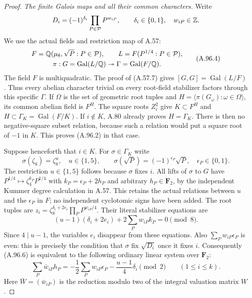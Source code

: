\begin{proof}
\emph{The finite Galois maps and all their common characters.}
Write
\[
 D_i=(-1)^{\delta_i}\prod_{P\in\mathcal P}P^{w_{iP}},
       \qquad \delta_i\in\{0,1\},\quad w_{iP}\in\mathbb Z.
\]
We use the
actual fields and restriction map of A.57:
\[
 \begin{gathered}
 F=\mathbb Q(\mu_8,\sqrt P:P\in\mathcal P),\qquad
 L=F(P^{1/4}:P\in\mathcal P),\\
 \pi:G=\operatorname{Gal}(L/\mathbb Q)\twoheadrightarrow
                     \Gamma=\operatorname{Gal}(F/\mathbb Q).
 \end{gathered}
 \tag{A.96.4}
\]
The field $F$ is multiquadratic.
The proof of (A.57.7) gives $[G,G]=\operatorname{Gal}(L/F)$.
Thus every abelian character trivial on every root-field
stabilizer factors through this specific $\Gamma$.
If $\Omega$ is the set of geometric root tuples and
$H=\langle\pi(G_\omega):\omega\in\Omega\rangle$, its common
abelian field is $F^H$.
The square roots $Z_i^2$ give $K\subset F^H$ and
$H\subset\Gamma_K=\operatorname{Gal}(F/K)$.
If $i\notin K$, A.80 already proves $H=\Gamma_K$.
There is then no negative-square subset relation, because
such a relation would put a square root of $-1$ in $K$.
This proves (A.96.2) in that case.

Suppose henceforth that $i\in K$.
For $\sigma\in\Gamma_K$ write
\[
 \sigma(\zeta_8)=\zeta_8^u,\quad u\in\{1,5\},\qquad
 \sigma(\sqrt P)=(-1)^{\epsilon_P}\sqrt P,
                         \quad\epsilon_P\in\{0,1\}.
 \tag{A.96.5}
\]
The restriction $u\in\{1,5\}$ follows because $\sigma$ fixes
$i$.
All lifts of $\sigma$ to $G$ have
$P^{1/4}\mapsto\zeta_4^{k_P}P^{1/4}$ with
$k_P=\epsilon_P+2h_P$ and arbitrary $h_P\in\mathbf F_2$,
by the independent Kummer degree calculation in A.57.
This retains the actual relations between $u$ and the
$\epsilon_P$ in $F$; no independent cyclotomic signs
have been added.
The root tuples are
$z_i=\zeta_8^{\delta_i+2e_i}\prod_P P^{w_{iP}/4}$.
Their literal stabilizer equations are
\[
 (u-1)(\delta_i+2e_i)+2\sum_Pw_{iP}k_P=0\pmod8.
 \tag{A.96.6}
\]
Since $4\mid u-1$, the variables $e_i$ disappear from
these equations.
Also $\sum_Pw_{iP}\epsilon_P$ is even: this is precisely
the condition that $\sigma$ fix $\sqrt{D_i}$ once it
fixes $i$.
Consequently (A.96.6) is equivalent to the following
ordinary linear system over $\mathbf F_2$:
\[
 \sum_P\bar w_{iP}h_P
   =-\frac12\sum_Pw_{iP}\epsilon_P
        -\frac{u-1}{4}\delta_i\pmod2
                       \qquad(1\le i\le k).
 \tag{A.96.7}
\]
Here $\bar W=(\bar w_{iP})$ is the reduction modulo two
of the integral valuation matrix $W$.


\end{proof}
